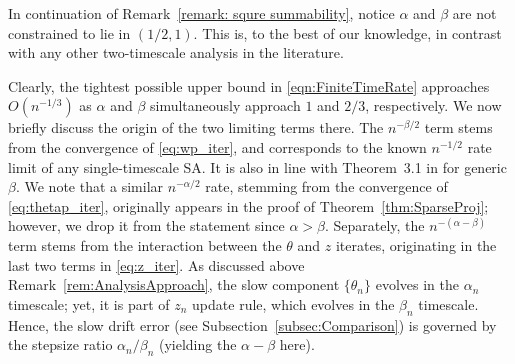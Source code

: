 \documentclass[usenames,dvipsnames,final,12pt]{colt2018} %
\newcommand{\st}{\alpha}
\newcommand{\sw}{\beta}
\newcommand{\gal}[1]{#1}
\newcommand{\gugan}[1]{#1}
\begin{document}
\gal{
\begin{remark}
	In continuation of Remark~\ref{remark: squre summability}, notice $\alpha$ and $\beta$ are not constrained to lie in $(1/2,1)$. This is, to the best of our knowledge, in contrast with any other two-timescale analysis in the literature.
\end{remark}
}
\gal{
\begin{remark}
	\label{rem: optimal rate}
Clearly, the tightest possible upper bound in \eqref{eqn:FiniteTimeRate} approaches $O(n^{-1/3})$ as $\alpha$ and $\beta$ simultaneously approach $1$ and $2/3$, respectively. 
We now briefly discuss the origin of the two limiting terms \gugan{there}. The $n^{-\beta/2}$ term stems from the convergence of \eqref{eq:wp_iter}, and corresponds to the known $n^{-1/2}$ rate limit of any single-timescale SA. It is also in line with Theorem~3.1 in \citep{dalal2018finite} for generic $\beta$. We note that a similar $n^{-\alpha/2}$ rate, stemming from the convergence of \eqref{eq:thetap_iter},  originally appears in the proof of Theorem~\ref{thm:SparseProj}; however, we drop it from the statement since $\alpha > \beta$. Separately, \gugan{the} $n^{-(\alpha - \beta)}$ term stems from the interaction between the $\theta$ and $z$ iterates, originating in \gugan{the last two terms in \eqref{eq:z_iter}}.
As \gugan{discussed above} Remark~\ref{rem:AnalysisApproach}, the slow component $\{\theta_n\}$ evolves in the $\st_n$ timescale; yet, it is part of $z_n$ update rule, which evolves in the $\sw_n$ timescale. Hence, the slow drift error (\gugan{see} Subsection~\ref{subsec:Comparison}) is governed by the \gugan{stepsize ratio} $\alpha_n /\beta_n$  (yielding the $\alpha - \beta$ here).
\end{remark}

}
\end{document}
